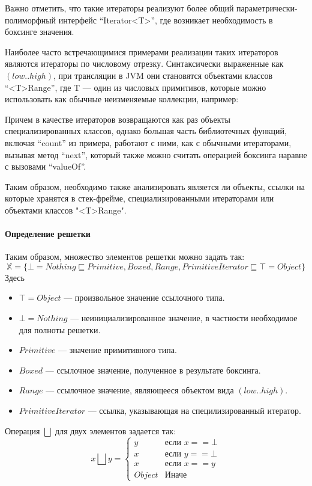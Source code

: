 Важно отметить, что такие итераторы реализуют более общий параметрически-полиморфный интерфейс
``Iterator<T>'', где возникает необходимость в боксинге значения.

Наиболее часто встречающимися примерами реализации таких итераторов являются итераторы
по числовому отрезку. Синтаксически выраженные как $(low..high)$, при трансляции в JVM они
становятся объектами классов ``<T>Range'', где T --- один из числовых примитивов, которые можно
использовать как обычные неизменяемые коллекции, например:

Причем в качестве итераторов возвращаются как раз объекты специализированных классов, однако
большая часть библиотечных функций, включая ``count'' из примера, работают с ними, как с обычными
итераторами, вызывая метод ``next'', который также можно считать операцией боксинга наравне
с вызовами ``valueOf''.

Таким образом, необходимо также анализировать является ли объекты, ссылки на которые хранятся
в стек-фрейме, специализированными итераторами или объектами классов "<T>Range".

\paragraph{Определение решетки}
Таким образом, множество элементов решетки можно задать так:
$$\mathbb{X} = \{\bot = Nothing \sqsubseteq  Primitive, Boxed, Range, PrimitiveIterator \sqsubseteq \top = Object \}$$
Здесь
\begin{itemize}
    \item $\top = Object$ --- произвольное значение ссылочного типа.
    \item $\bot = Nothing$ --- неинициализированное значение, в частности необходимое для полноты
    решетки.
    \item $Primitive$ --- значение примитивного типа.
    \item $Boxed$ --- ссылочное значение, полученное в результате боксинга.
    \item $Range$ --- ссылочное значение, являющееся объектом вида $(low..high)$.
    \item $PrimitiveIterator$ --- ссылка, указывающая на специлизированный итератор.
\end{itemize}

Операция $\bigsqcup$ для двух элементов задается так:
$$x \bigsqcup y =
\begin{cases}
y & \text{если } x == \bot \\
x & \text{если } y == \bot \\
x & \text{если } x == y \\
Object & \textit{Иначе}
\end{cases}
$$


